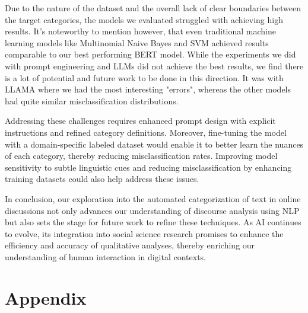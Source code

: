 \documentclass[fleqn,moreauthors,10pt]{ds_report}
\begin{document}
Due to the nature of the dataset and the overall lack of clear boundaries between the target categories, the models we evaluated struggled with achieving high results. It's noteworthy to mention however, that even traditional machine learning models like Multinomial Naive Bayes and SVM achieved results comparable to our best performing BERT model. While the experiments we did with prompt engineering and LLMs did not achieve the best results, we find there is a lot of potential and future work to be done in this direction. It was with LLAMA where we had the most interesting "errors", whereas the other models had quite similar misclassification distributions. 

Addressing these challenges requires enhanced prompt design with explicit instructions and refined category definitions. Moreover, fine-tuning the model with a domain-specific labeled dataset would enable it to better learn the nuances of each category, thereby reducing misclassification rates. Improving model sensitivity to subtle linguistic cues and reducing misclassification by enhancing training datasets could also help address these issues.

In conclusion, our exploration into the automated categorization of text in online discussions not only advances our understanding of discourse analysis using NLP but also sets the stage for future work to refine these techniques. As AI continues to evolve, its integration into social science research promises to enhance the efficiency and accuracy of qualitative analyses, thereby enriching our understanding of human interaction in digital contexts.




\appendix
\section*{Appendix}
\end{document}
